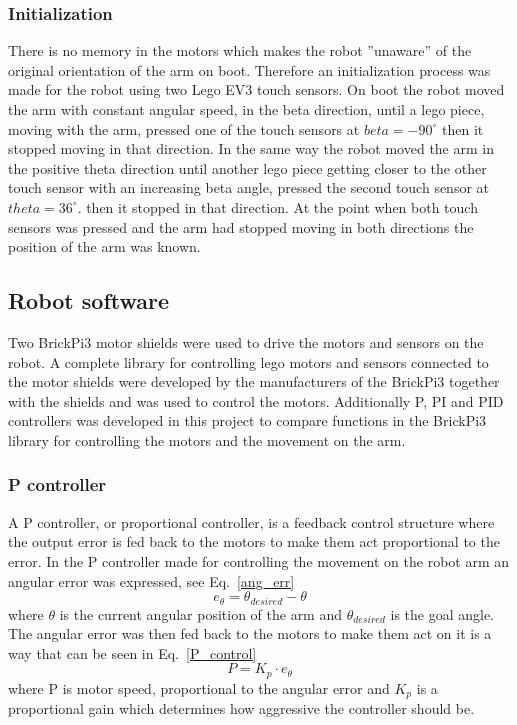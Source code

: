 \subsubsection{Initialization}
There is no memory in the motors which makes the robot ''unaware'' of the original orientation of the arm on boot. Therefore an initialization process was made for the robot using two Lego EV3 touch sensors. On boot the robot moved the arm with constant angular speed, in the beta direction, until a lego piece, moving with the arm, pressed one of the touch sensors at \(beta = -90^{\circ}\) then it stopped moving in that direction. In the same way the robot moved the arm in the positive theta direction until another lego piece getting closer to the other touch sensor with an increasing beta angle, pressed the second touch sensor at \(theta = 36^{\circ}\). then it stopped in that direction. At the point when both touch sensors was pressed and the arm had stopped moving in both directions the position of the arm was known.
\subsection{Robot software}
Two BrickPi3 motor shields were used to drive the motors and sensors on the robot. A complete library for controlling lego motors and sensors connected to the motor shields were developed by the manufacturers of the BrickPi3 together with the shields and was used to control the motors. Additionally P, PI and PID controllers was developed in this project to compare functions in the BrickPi3 library for controlling the motors and the movement on the arm.
\subsubsection{P controller}
A P controller, or proportional controller, is a feedback control structure where the output error is fed back to the motors to make them act proportional to the error. In the P controller made for controlling the movement on the robot arm an angular error was expressed, see Eq.~\eq\ref{ang_err}
\begin{equation}
    e_{\theta} = \theta_{desired} - \theta
    \label{ang_err}
\end{equation}
where \(\theta\) is the current angular position of the arm and \(\theta_{desired}\) is the goal angle. The angular error was then fed back to the motors to make them act on it is a way that can be seen in Eq.~\eq\ref{P_control}
\begin{equation}
    P = K_p\cdot e_{\theta}
    \label{P_control}
\end{equation}
where P is motor speed, proportional to the angular error and \(K_p\) is a proportional gain which determines how aggressive the controller should be.

